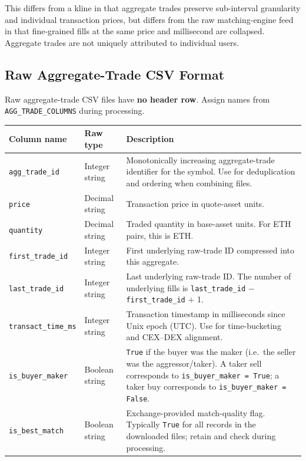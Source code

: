 \documentclass[11pt,a4paper]{article}
\begin{document}
This differs from a kline in that aggregate trades preserve
sub-interval granularity and individual transaction prices, but
differs from the raw matching-engine feed in that fine-grained fills
at the same price and millisecond are collapsed. Aggregate trades are
not uniquely attributed to individual users.

\subsection{Raw Aggregate-Trade CSV Format}

Raw aggregate-trade CSV files have \textbf{no header row}. Assign
names from \texttt{AGG\_TRADE\_COLUMNS} during processing.

\begin{xltabular}{\linewidth}{L{4.2cm}L{2.8cm}Y}
\toprule
\textbf{Column name} & \textbf{Raw type} & \textbf{Description} \\
\midrule
\texttt{agg\_trade\_id} & Integer string &
  Monotonically increasing aggregate-trade identifier for the symbol.
  Use for deduplication and ordering when combining files. \\
\texttt{price} & Decimal string &
  Transaction price in quote-asset units. \\
\texttt{quantity} & Decimal string &
  Traded quantity in base-asset units. For ETH pairs, this is ETH. \\
\texttt{first\_trade\_id} & Integer string &
  First underlying raw-trade ID compressed into this aggregate. \\
\texttt{last\_trade\_id} & Integer string &
  Last underlying raw-trade ID. The number of underlying fills is
  \texttt{last\_trade\_id} $-$ \texttt{first\_trade\_id} $+$ 1. \\
\texttt{transact\_time\_ms} & Integer string &
  Transaction timestamp in milliseconds since Unix epoch (UTC).
  Use for time-bucketing and CEX--DEX alignment. \\
\texttt{is\_buyer\_maker} & Boolean string &
  \texttt{True} if the buyer was the maker (i.e.\ the seller was
  the aggressor/taker). A taker sell corresponds to
  \texttt{is\_buyer\_maker = True}; a taker buy corresponds to
  \texttt{is\_buyer\_maker = False}. \\
\texttt{is\_best\_match} & Boolean string &
  Exchange-provided match-quality flag. Typically \texttt{True} for
  all records in the downloaded files; retain and check during
  processing. \\
\bottomrule
\end{xltabular}
\end{document}
